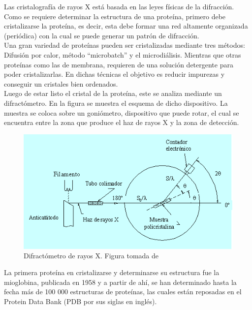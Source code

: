 Las cristalograf\'{i}a de rayos X est\'{a} basada en las leyes f\'{i}sicas de la difracci\'{o}n. Como se requiere determinar la estructura de una prote\'{i}na, primero debe cristalizarse la prote\'{i}na, es decir, esta debe formar una red altamente organizada (peri\'{o}dica) con la cual se puede generar un patr\'{o}n de difracci\'{o}n.\\

Una gran variedad de prote\'{i}nas pueden ser cristalizadas mediante tres m\'{e}todos: Difusi\'{o}n por calor, m\'{e}todo ``microbatch'' y el microdi\'{a}lisis. Mientras que otras prote\'{i}nas como las de membrana, requieren de una soluci\'{o}n detergente para poder cristalizarlas. En dichas t\'{e}cnicas el objetivo es reducir impurezas y conseguir un cristales bien ordenados.\\

Luego de estar listo el cristal de la prote\'{i}na, este se analiza mediante un difract\'{o}metro. En la figura se muestra el esquema de dicho dispositivo. La muestra se coloca sobre un goni\'{o}metro, dispositivo que puede rotar, el cual se encuentra entre la zona que produce el haz de rayos X y la zona de detecci\'{o}n.\\
\begin{figure}[h]
 \centering
 \includegraphics[scale=0.5]{Kap3/diffractometer.png}
 \caption{Difract\'{o}metro de rayos X. Figura tomada de \cite{UniversidadPolitecnicadeValenciaMetodoX}}
 \label{fig:dif}
\end{figure}


La primera prote\'{i}na en cristalizarse y determinarse su estructura fue la mioglobina, publicada en 1958 \cite{Nelson2011} y a partir de ah\'{i}, se han determinado hasta la fecha m\'{a}s de 100 000 estructuras de prote\'{i}nas, las cuales est\'{a}n reposadas en el Protein Data Bank (PDB por sus siglas en ingl\'{e}s).\\

